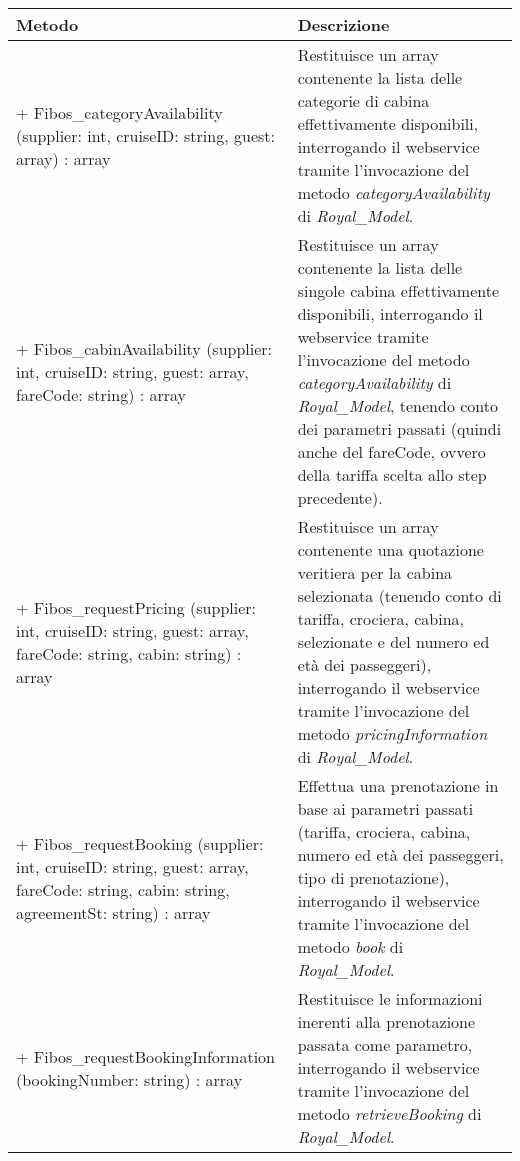 \begin{center}
	\def\arraystretch{1.5}
	\begin{longtable}{ >{\raggedright}p{5.5cm} p{6.8cm}} 
		\hline
		\textbf{Metodo} & \textbf{Descrizione} \\
		\hline
		+ Fibos\_categoryAvailability (supplier: int, cruiseID: string, guest: array) : array & Restituisce un array contenente la lista delle categorie di cabina effettivamente disponibili, interrogando il \gls{webservice} tramite l'invocazione del metodo \textit{categoryAvailability} di \textit{Royal\_Model}.\\
		\hline
		+ Fibos\_cabinAvailability (supplier: int, cruiseID: string, guest: array, fareCode: string) : array & Restituisce un array contenente la lista delle singole cabina effettivamente disponibili, interrogando il \gls{webservice} tramite l'invocazione del metodo \textit{categoryAvailability} di \textit{Royal\_Model}, tenendo conto dei parametri passati (quindi anche del fareCode, ovvero della tariffa scelta allo step precedente).\\
		\hline
		+ Fibos\_requestPricing (supplier: int, cruiseID: string, guest: array, fareCode: string, cabin: string) : array & Restituisce un array contenente una quotazione veritiera per la cabina selezionata (tenendo conto di tariffa, crociera, cabina, selezionate e del numero ed età dei passeggeri), interrogando il \gls{webservice} tramite l'invocazione del metodo \textit{pricingInformation} di \textit{Royal\_Model}.\\
		\hline
		+ Fibos\_requestBooking (supplier: int, cruiseID: string, guest: array, fareCode: string, cabin: string, agreementSt: string) : array & Effettua una prenotazione in base ai parametri passati (tariffa, crociera, cabina, numero ed età dei passeggeri, tipo di prenotazione), interrogando il \gls{webservice} tramite l'invocazione del metodo \textit{book} di \textit{Royal\_Model}.\\
		\hline
		+ Fibos\_requestBookingInformation (bookingNumber: string) : array & Restituisce le informazioni inerenti alla prenotazione passata come parametro, interrogando il \gls{webservice} tramite l'invocazione del metodo \textit{retrieveBooking} di \textit{Royal\_Model}.\\
		\hline
	\end{longtable}
\end{center}

